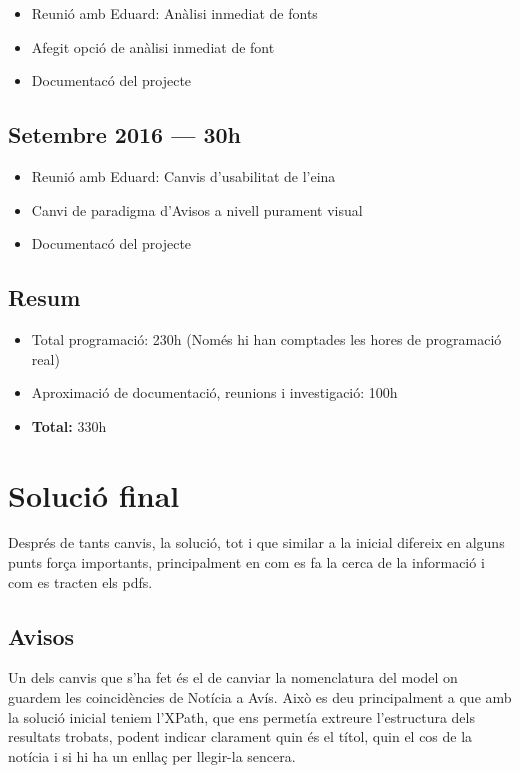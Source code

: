 \documentclass{article}
\begin{document}
\begin{itemize}
    \item Reunió amb Eduard: Anàlisi inmediat de fonts
    \item Afegit opció de anàlisi inmediat de font
    \item Documentacó del projecte
\end{itemize}

\subsection{Setembre 2016 --- 30h}

\begin{itemize}
    \item Reunió amb Eduard: Canvis d'usabilitat de l'eina
    \item Canvi de paradigma d'Avisos a nivell purament visual
    \item Documentacó del projecte
\end{itemize}

\subsection{Resum}

\begin{itemize}
    \item Total programació: 230h (Només hi han comptades les hores de programació real)
    \item Aproximació de documentació, reunions i investigació: 100h
    \item \textbf{Total:} 330h
\end{itemize}

\newpage

\section{Solució final}

Després de tants canvis, la solució, tot i que similar a la inicial difereix en alguns punts força importants, principalment en com es fa la cerca de la informació i com es tracten els pdfs.

\subsection{Avisos}

Un dels canvis que s'ha fet és el de canviar la nomenclatura del model on guardem les coincidències de Notícia a Avís. Això es deu principalment a que amb la solució inicial teniem l'XPath, que ens permetía extreure l'estructura dels resultats trobats, podent indicar clarament quin és el títol, quin el cos de la notícia i si hi ha un enllaç per llegir-la sencera.
\end{document}
